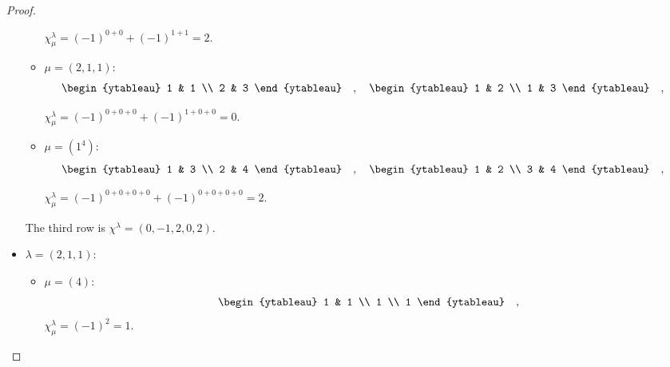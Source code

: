 \documentclass[8pt]{extarticle}
\newcommand{\<}{\langle}
\renewcommand{\>}{\rangle}
\theoremstyle{definition}
\begin{document}
\begin{proof}
\begin{itemize}
\begin{itemize}
      $\chi_{\mu}^{\lambda} = (-1)^{0 + 0} + (-1)^{1 + 1} = 2$.

    \item
      $\mu = (2,1,1)$:
      \begin{align*}
        \begin{ytableau}
          1 & 1 \\
          2 & 3 
        \end{ytableau}\quad,\quad
        \begin{ytableau}
          1 & 2 \\
          1 & 3 
        \end{ytableau}\quad,\quad        
      \end{align*}
      
      $\chi_{\mu}^{\lambda} = (-1)^{0 + 0 + 0} + (-1)^{1 + 0 + 0} = 0$.

    \item
      $\mu = (1^4)$:
      \begin{align*}
        \begin{ytableau}
          1 & 3 \\
          2 & 4 
        \end{ytableau}\quad,\quad
        \begin{ytableau}
          1 & 2 \\
          3 & 4 
        \end{ytableau}\quad,\quad
      \end{align*}
      
      $\chi_{\mu}^{\lambda} = (-1)^{0 + 0 + 0 + 0} + (-1)^{0 + 0 + 0 + 0} = 2$.      
    \end{itemize}
    The third row is $\chi^\lambda = (0,-1,2,0,2)$.

  \item
    $\lambda = (2,1,1)$:
    
    \begin{itemize}
      
    \item
      $\mu = (4)$:
      \begin{align*}
        \begin{ytableau}
          1 & 1 \\
          1 \\
          1
        \end{ytableau}\quad,
      \end{align*}
      $\chi_{\mu}^{\lambda} = (-1)^{2} = 1$.


\end{itemize}
\end{itemize}
\end{proof}
\end{document}

